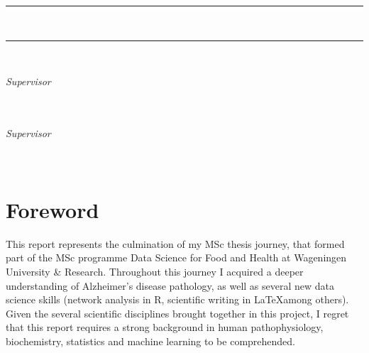 \documentclass{amsart}
\newcommand{\frontmatter}{
    \pagenumbering{roman}   %
}
\begin{document}
\begin{titlepage}
\vspace{1cm}
\begin{center}
\par
\noindent
\rule[0.2cm]{\linewidth}{1.5pt}
\Huge
\textbf{\thesisTitle}
\vspace{0.2cm}
\LARGE
\par
\noindent
\thesisSubTitle\\
\rule[0.2cm]{\linewidth}{1.5pt}
\Large
\end{center}


\vspace{2cm}
\noindent
\LARGE
\thesisAuthor\\
\vspace{.2 cm}
\small
\par \noindent
\thesisDegree
\par \noindent
\university
\par \noindent
\thesisPlaceDate


\vspace{4cm}
\begin{flushright}
\emph{Supervisor} \\
\textbf{\supervisor} \\
\departmentSUP\\
\universitySUP
\end{flushright}

\vspace{.5cm}
\begin{flushright}
\emph{Supervisor} \\
\textbf{\cosupervisor} \\
\departmentCOSUP \\
\universityCOSUP
\end{flushright}
\end{titlepage}
\frontmatter
\section*{Foreword}
This report represents the culmination of my MSc thesis journey, that formed part of the MSc programme Data Science for Food and Health at Wageningen University \& Research. Throughout this journey I acquired a deeper understanding of Alzheimer's disease pathology, as well as several new data science skills (network analysis in R, scientific writing in \LaTeX among others). Given the several scientific disciplines brought together in this project, I regret that this report requires a strong background in human pathophysiology, biochemistry, statistics and machine learning to be comprehended.
\end{document}
